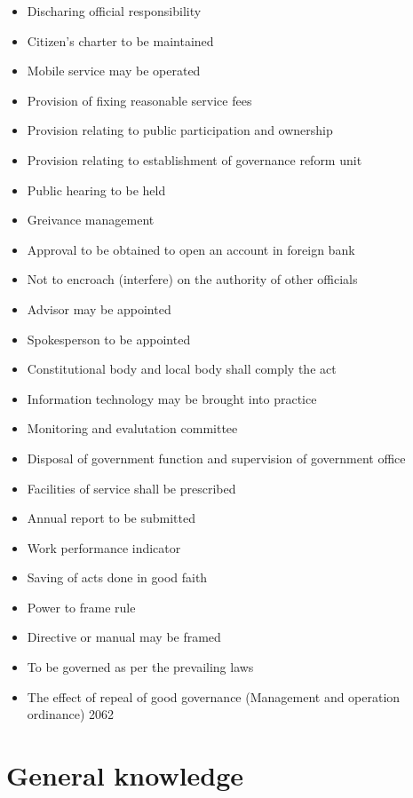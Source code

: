 \documentclass[
  openany]{book}
\providecommand{\tightlist}{%
  \setlength{\itemsep}{0pt}\setlength{\parskip}{0pt}}
\begin{document}
\begin{itemize}
\tightlist
\item
  Discharing official responsibility
\item
  Citizen's charter to be maintained
\item
  Mobile service may be operated
\item
  Provision of fixing reasonable service fees
\item
  Provision relating to public participation and ownership
\item
  Provision relating to establishment of governance reform unit
\item
  Public hearing to be held
\item
  Greivance management
\item
  Approval to be obtained to open an account in foreign bank
\item
  Not to encroach (interfere) on the authority of other officials
\item
  Advisor may be appointed
\item
  Spokesperson to be appointed
\item
  Constitutional body and local body shall comply the act
\item
  Information technology may be brought into practice
\item
  Monitoring and evalutation committee
\item
  Disposal of government function and supervision of government office
\item
  Facilities of service shall be prescribed
\item
  Annual report to be submitted
\item
  Work performance indicator
\item
  Saving of acts done in good faith
\item
  Power to frame rule
\item
  Directive or manual may be framed
\item
  To be governed as per the prevailing laws
\item
  The effect of repeal of good governance (Management and operation ordinance) 2062
\end{itemize}

\hypertarget{general-knowledge}{%
\chapter{General knowledge}\label{general-knowledge}}
\end{document}
